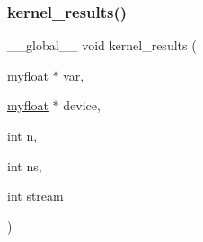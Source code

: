 \mbox{\label{mc__gpu_8cu_a172551f61a20c0c530fa3fd3d7ce6eca}} 
\subsubsection{\texorpdfstring{kernel\+\_\+results()}{kernel\_results()}}
{\footnotesize\ttfamily \+\_\+\+\_\+global\+\_\+\+\_\+ void kernel\+\_\+results (\begin{DoxyParamCaption}\item[{\hyperlink{param_8h_a5f097c9f3873af7be7fc156e6a06ca5e}{myfloat} $\ast$}]{var,  }\item[{\hyperlink{param_8h_a5f097c9f3873af7be7fc156e6a06ca5e}{myfloat} $\ast$}]{device,  }\item[{int}]{n,  }\item[{int}]{ns,  }\item[{int}]{stream }\end{DoxyParamCaption})}

\mbox{\label{mc__gpu_8cu_ad6f7a3a9c61ed187d9008e1abe89f357}} 
